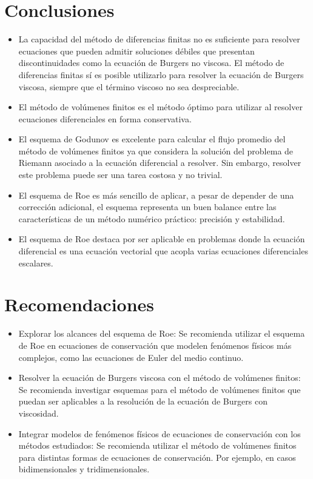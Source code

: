 \documentclass[12pt]{article}
\begin{document}
	\section{Conclusiones}
	\begin{itemize}
		\item La capacidad del método de diferencias finitas no es suficiente para resolver ecuaciones que pueden admitir soluciones débiles que presentan discontinuidades como la ecuación de Burgers no viscosa. El método de diferencias finitas sí es posible utilizarlo para resolver la ecuación de Burgers viscosa, siempre que el término viscoso no sea despreciable.
		\item El método de volúmenes finitos es el método óptimo para utilizar al resolver ecuaciones diferenciales en forma conservativa. 
		\item El esquema de Godunov es excelente para calcular el flujo promedio del método de volúmenes finitos ya que considera la solución del problema de Riemann asociado a la ecuación diferencial a resolver. Sin embargo, resolver este problema puede ser una tarea costosa y no trivial.
		\item El esquema de Roe es más sencillo de aplicar, a pesar de depender de una corrección adicional, el esquema representa un buen balance entre las características de un método numérico práctico: precisión y estabilidad.
		\item El esquema de Roe destaca por ser aplicable en problemas donde la ecuación diferencial es una ecuación vectorial que acopla varias ecuaciones diferenciales escalares.
	\end{itemize}
	\section{Recomendaciones}
	\begin{itemize}
		\item Explorar los alcances del esquema de Roe: Se recomienda utilizar el esquema de Roe en ecuaciones de conservación que modelen fenómenos físicos más complejos, como las ecuaciones de Euler del medio continuo.
		\item Resolver la ecuación de Burgers viscosa con el método de volúmenes finitos: Se recomienda investigar esquemas para el método de volúmenes finitos que puedan ser aplicables a la resolución de la ecuación de Burgers con viscosidad.
		\item Integrar modelos de fenómenos físicos de ecuaciones de conservación con los métodos estudiados: Se recomienda utilizar el método de volúmenes finitos para distintas formas de ecuaciones de conservación. Por ejemplo, en casos bidimensionales y tridimensionales.
	\end{itemize}
	\printbibliography
	
\end{document}
